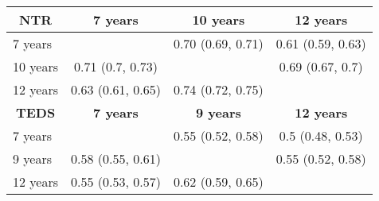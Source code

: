 \begin{tabular}{lccr}
  \toprule
  \multicolumn{1}{c}{\textbf{NTR}} & \textbf{7 years} & \textbf{10 years} & \multicolumn{1}{c}{\textbf{12 years}} \\
  \midrule
  7 years &       & 0.70 (0.69, 0.71) & \multicolumn{1}{c}{0.61 (0.59, 0.63)} \\
  10 years & 0.71 (0.7, 0.73) &       & \multicolumn{1}{c}{0.69 (0.67, 0.7)} \\
  12 years & 0.63 (0.61, 0.65) & 0.74 (0.72, 0.75) &  \\
  \midrule
  \multicolumn{1}{c}{\textbf{TEDS}} & \textbf{7 years} & \textbf{9 years} & \multicolumn{1}{c}{\textbf{12 years}} \\
  \midrule
  7 years &       & 0.55 (0.52, 0.58) & \multicolumn{1}{c}{0.5 (0.48, 0.53)} \\
  9 years & 0.58 (0.55, 0.61) &       & \multicolumn{1}{c}{0.55 (0.52, 0.58)} \\
  12 years & 0.55 (0.53, 0.57) & 0.62 (0.59, 0.65) &  \\
  \bottomrule
\end{tabular}%
